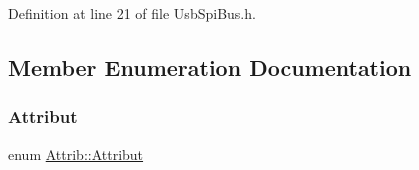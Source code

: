 Definition at line 21 of file Usb\+Spi\+Bus.\+h.



\subsection{Member Enumeration Documentation}
\mbox{\label{classAttrib_a69e171d7cc6417835a5a306d3c764235}} 
\subsubsection{\texorpdfstring{Attribut}{Attribut}}
{\footnotesize\ttfamily enum \hyperlink{classAttrib_a69e171d7cc6417835a5a306d3c764235}{Attrib\+::\+Attribut}\hspace{0.3cm}{\ttfamily [inherited]}}

